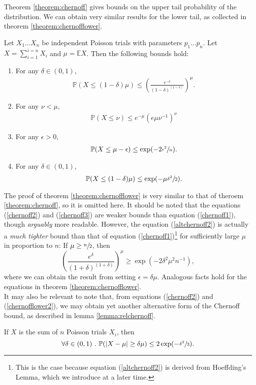 	Theorem \ref{theorem:chernoff} gives bounds on the upper tail probability of the 
	distribution. We can obtain very similar results  for the lower tail, as collected in 
	theorem \ref{theorem:chernofflower}.
	\begin{theorem}
		\label{theorem:chernofflower}
		Let $X_1\hdots X_n$ be independent Poisson trials with parameters $p_1\hdots p_n$.
		Let $X = \sum_{i=1}^{i=n} X_i$ and $\mu = \mathbb{E}X$. Then the following bounds 
		hold:
		\begin{enumerate}
			\item For any $\delta \in (0, 1)$, 
			\begin{align}
				\mathbb{P}(X \leq (1-\delta)\mu) \leq 
				\left(\frac{e^{-\delta}}{(1-\delta)^{(1-\delta)}}\right)^\mu.
				\label{chernofflower1}
			\end{align}
			\item For any $\nu < \mu$, 
			\begin{align}
				\mathbb{P}(X \leq \nu) \leq e^{-\mu} \left(e\mu\nu^{-1}\right)^\nu
				\label{altchernofflower1}
			\end{align}
			\item For any $\epsilon > 0$,
			\begin{align}
				\mathbb{P}(X\leq \mu-\epsilon)\leq\exp(-2\sfrac{\epsilon^2}{n}).
				\label{altchernofflower2}
			\end{align}
			\item For any $\delta \in (0,1)$,
			\begin{align}
				\mathbb{P}(X\leq (1-\delta)\mu) \leq \exp(-\mu\sfrac{\delta^2}{2}).
				\label{chernofflower2}
			\end{align}
		\end{enumerate}
	\end{theorem}
	The proof of theorem \ref{theorem:chernofflower} is very similar to that of theroem 
	\ref{theorem:chernoff}, so it is omitted here. It should be noted that the equations 
	(\ref{chernoff2}) and (\ref{chernoff3}) are weaker bounds than equation (\ref{chernoff1}),
	though \emph{arguably} more readable. However, the equation (\ref{altchernoff2}) is 
	actually a \emph{much tighter} bound than that of equation (\ref{chernoff1})\footnote{This 
	is the case because equation (\ref{altchernoff2}) is derived from Hoeffding's Lemma, which 
	we introduce at a later time.} for sufficiently large $\mu$ in proportion to $n$: If $\mu 
	\geq \sfrac{n}{2}$, then 
	$$
		\left(\frac{e^\delta}{(1+\delta)^{(1+\delta)}}\right)^\mu \geq 
		\exp\left(-2\delta^2\mu^2n^{-1}\right),
	$$
	where we can obtain the result from setting $\epsilon = \delta\mu$. Analogous facts hold 
	for the equations in theorem \ref{theorem:chernofflower}.
	\\
	It may also be relevant to note that, from equations (\ref{chernoff2}) and 
	(\ref{chernofflower2}), we may obtain yet another alternative form of the Chernoff bound, 
	as described in lemma \ref{lemma:relchernoff}.
	\begin{lemma}
	\label{lemma:relchernoff}
		If $X$ is the sum of $n$ Poisson trials $X_i$, then
		$$
			\forall \delta \in (0,1)\ .\ \mathbb{P}(|X - \mu| \geq \delta\mu) \leq
			2 \exp(-\sfrac{\delta^2}{3}).
		$$
	\end{lemma}
	
